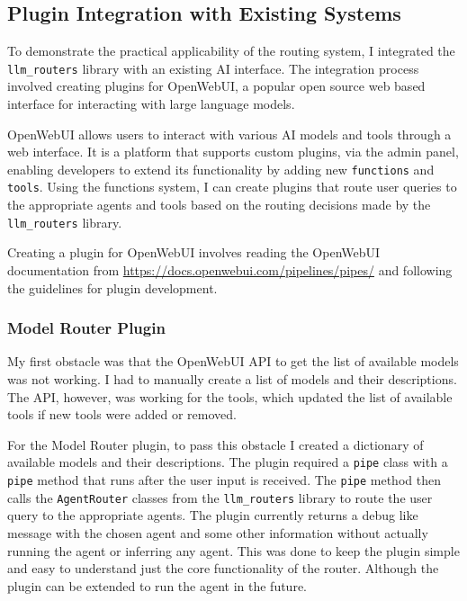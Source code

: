 \subsection{Plugin Integration with Existing Systems}

To demonstrate the practical applicability of the routing system, I integrated the \texttt{llm\_routers} library with an existing AI interface. The integration process involved creating plugins for OpenWebUI, a popular open source web based interface for interacting with large language models.

OpenWebUI allows users to interact with various AI models and tools through a web interface. It is a platform that supports custom plugins, via the admin panel, enabling developers to extend its functionality by adding new \texttt{functions} and \texttt{tools}. Using the functions system, I can create plugins that route user queries to the appropriate agents and tools based on the routing decisions made by the \texttt{llm\_routers} library.

Creating a plugin for OpenWebUI involves reading the OpenWebUI documentation from \url{https://docs.openwebui.com/pipelines/pipes/} and following the guidelines for plugin development.

\subsubsection{Model Router Plugin}

My first obstacle was that the OpenWebUI API to get the list of available models was not working. I had to manually create a list of models and their descriptions. The API, however, was working for the tools, which updated the list of available tools if new tools were added or removed.

For the Model Router plugin, to pass this obstacle I created a dictionary of available models and their descriptions. The plugin required a \texttt{pipe} class with a \texttt{pipe} method that runs after the user input is received. The \texttt{pipe} method then calls the \texttt{AgentRouter} classes from the \texttt{llm\_routers} library to route the user query to the appropriate agents. The plugin currently returns a debug like message with the chosen agent and some other information without actually running the agent or inferring any agent. This was done to keep the plugin simple and easy to understand just the core functionality of the router. Although the plugin can be extended to run the agent in the future.

